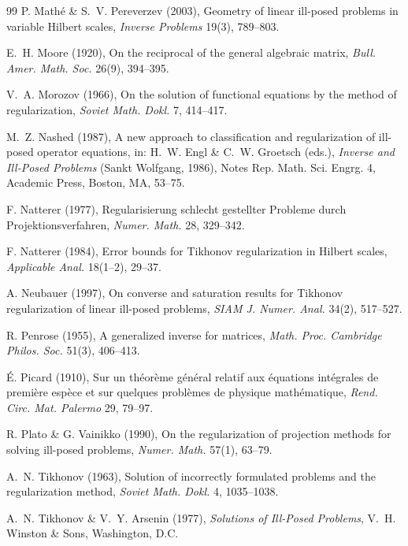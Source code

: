 \documentclass[a4paper]{report}
\theoremstyle{plain}
\theoremstyle{definition}
\theoremstyle{remark}
\begin{document}
\begin{thebibliography}{99}
P. Math\'e \& S.~V. Pereverzev (2003), Geometry of linear ill-posed problems in variable
Hilbert scales, \emph{Inverse Problems} 19(3), 789--803.

E.~H. Moore (1920), On the reciprocal of the general algebraic matrix, \emph{Bull. Amer.
Math. Soc.} 26(9), 394--395.

V.~A. Morozov (1966), On the solution of functional equations by the method of
regularization, \emph{Soviet Math. Dokl.} 7, 414--417.

M.~Z. Nashed (1987), A new approach to classification and regularization of ill-posed
operator equations, in: H.~W. Engl \& C.~W. Groetsch (eds.), \emph{Inverse and Ill-Posed
Problems} (Sankt Wolfgang, 1986), Notes Rep. Math. Sci. Engrg. 4, Academic Press, Boston,
MA, 53--75.

F. Natterer (1977), Regularisierung schlecht gestellter Probleme durch
Projektionsverfahren, \emph{Numer. Math.} 28, 329--342.

F. Natterer (1984), Error bounds for Tikhonov regularization in Hilbert scales,
\emph{Applicable Anal.} 18(1--2), 29--37.

A. Neubauer (1997), On converse and saturation results for Tikhonov regularization of
linear ill-posed problems, \emph{SIAM J. Numer. Anal.} 34(2), 517--527.

R. Penrose (1955), A generalized inverse for matrices, \emph{Math. Proc. Cambridge
Philos. Soc.} 51(3), 406--413.

\'E. Picard (1910), Sur un th\'eor\`eme g\'en\'eral relatif aux \'equations int\'egrales
de premi\`ere esp\`ece et sur quelques probl\`emes de physique math\'ematique,
\emph{Rend. Circ. Mat. Palermo} 29, 79--97.

R. Plato \& G. Vainikko (1990), On the regularization of projection methods for solving
ill-posed problems, \emph{Numer. Math.} 57(1), 63--79.

A.~N. Tikhonov (1963), Solution of incorrectly formulated problems and the
regularization method, \emph{Soviet Math. Dokl.} 4, 1035--1038.

A.~N. Tikhonov \& V.~Y. Arsenin (1977), \emph{Solutions of Ill-Posed Problems},
V.~H. Winston \& Sons, Washington, D.C.

\end{thebibliography}
\end{document}
